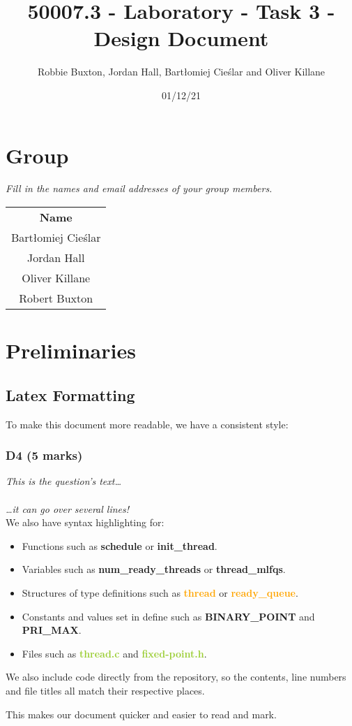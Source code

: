 \documentclass{report}
\title{50007.3 - Laboratory - Task 3 - Design Document}
\author{Robbie Buxton, Jordan Hall, Bartłomiej Cieślar and Oliver Killane}
\date{01/12/21}
\newcommand{\question}[1]{\textit{#1} \ }
\newcommand{\fun}[1]{\textcolor{Emerald}{\textbf{#1}}}
\newcommand{\file}[1]{\textcolor{YellowGreen}{\textbf{#1}}}
\newcommand{\struct}[1]{\textcolor{orange}{\textbf{#1}}}
\newcommand{\var}[1]{\textcolor{RoyalPurple}{\textbf{#1}}}
\newcommand{\const}[1]{\textcolor{BrickRed}{\textbf{#1}}}
\newcommand{\pintoscode}[4]{}
\begin{document}
	\maketitle

	\section*{Group}
		\question{Fill in the names and email addresses of your group members.}
		\begin{center}
			\begin{tabular}{c }
				\textbf{Name} \\
				Bartłomiej Cieślar \\
				Jordan Hall \\
				Oliver Killane \\
				Robert Buxton \\
			\end{tabular}
		\end{center}
	
	\section*{Preliminaries}
		\subsection*{Latex Formatting}
		To make this document more readable, we have a consistent style:
		\subsubsection*{D4 (5 marks)}
		\question{This is the question's text\dots
		\\
		\\ \dots it can go over several lines!}
		\\ We also have syntax highlighting for:
		\begin{itemize}
			\item Functions such as \fun{schedule} or \fun{init\_thread}.
			\item Variables such as \var{num\_ready\_threads} or 
			\var{thread\_mlfqs}.
			\item Structures of type definitions such as \struct{thread} or 
			\struct{ready\_queue}.
			\item Constants and values set in define such as 
			\const{BINARY\_POINT} and \const{PRI\_MAX}.
			\item Files such as \file{thread.c} and \file{fixed-point.h}.
		\end{itemize}
		We also include code directly from the repository, so the contents, line 
		numbers and file titles all match their respective places.
		\pintoscode{98}{110}{\file{syscall.c}}{/../userprog/syscall.c}
		This makes our document quicker and easier to read and mark.
\end{document}

